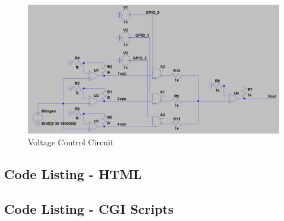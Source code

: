 \documentclass{article}	%
\begin{document}
\begin{figure}[!hbt]
\begin{center}
\includegraphics[width=1.0\textwidth,keepaspectratio]{voltage_control_circuit.png}
\end{center}
\caption{Voltage Control Circuit}
\end{figure}

\subsection{Code Listing - HTML}


\subsection{Code Listing - CGI Scripts}








%
\end{document}
